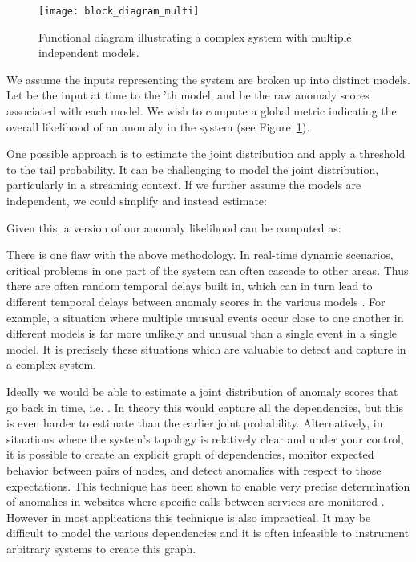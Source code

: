 \documentclass{article}
\begin{document}
\begin{figure}[ht]
\vskip 0.2in
\begin{center}
\centerline{\texttt{[image: block\_diagram\_multi]}}
\caption{Functional diagram illustrating a complex system with multiple
independent models.}
\label{block-diagram-multi}
\end{center}
\vskip -0.2in
\end{figure}

We assume the inputs representing the system are broken up into  distinct
models. Let  be the input at time  to the 'th model,
and  be the raw anomaly scores associated with each model. We wish to
compute a global metric indicating the overall likelihood of an anomaly in the
system (see Figure~\ref{block-diagram-multi}).



One possible
approach is to estimate the joint distribution  and
apply a threshold to the tail probability. It can be challenging
to model the joint distribution, particularly in a streaming context. If we
further assume the models are independent, we could simplify and instead estimate:



Given this, a version of our anomaly likelihood can be computed as:



There is one flaw with the above methodology. In real-time dynamic scenarios,
critical problems in one part of the system can often cascade to other areas.
Thus there are often random temporal delays built in, which can in turn lead to
different temporal delays between anomaly scores in the various models
\cite{Kim2013}. For example, a situation where multiple unusual events occur
close to one another in different models is far more unlikely and unusual than a
single event in a single model. It is precisely these situations which are
valuable to detect and capture in a complex system.

Ideally we would be able to estimate a joint distribution of anomaly scores that
go back in time, i.e. . In
theory this would capture all the dependencies, but this is even harder to
estimate than the earlier joint probability. Alternatively, in situations where
the system's topology is relatively
clear and under your control, it is possible to create an explicit graph of
dependencies, monitor expected behavior between pairs of nodes, and detect
anomalies with respect to those expectations. This technique has been shown to
enable very precise determination of anomalies in websites where
specific calls between services are monitored \cite{Kim2013}. However in most
applications this technique is also impractical. It may be difficult to model
the various dependencies and it is often infeasible to instrument arbitrary
systems to create this graph.
\end{document}
